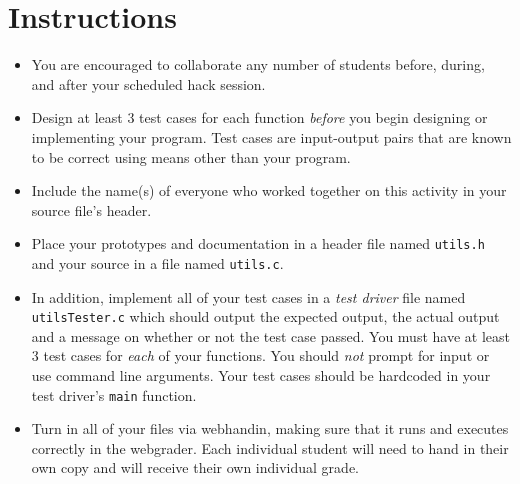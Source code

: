 \documentclass[12pt]{scrartcl}
\begin{document}
\section*{Instructions}

\begin{itemize}
  \item You are encouraged to collaborate any number of students 
  before, during, and after your scheduled hack session.  
  \item Design at least 3 test cases for each function
  \emph{before} you begin
  designing or implementing your program.  Test cases are 
  input-output pairs that are known to be correct using means
  other than your program.
  \item Include the name(s) of everyone who worked together on
  this activity in your source file's header.
  \item Place your prototypes and documentation in a header file 
  named \texttt{utils.h} and your source in a file
  named \texttt{utils.c}.
  \item In addition, implement all of your test cases in a
  \emph{test driver} file named \texttt{utilsTester.c}
  which should output the expected output, the actual output and
  a message on whether or not the test case passed.  You must have
  at least 3 test cases for \emph{each} of your functions.
  You should \emph{not} prompt for input or use command line 
  arguments.  Your test cases should be hardcoded in your test 
  driver's \texttt{main} function.  
  \item Turn in all of your files via webhandin, making sure that 
  it runs and executes correctly in the webgrader.  Each individual 
  student will need to hand in their own copy and will receive 
  their own individual grade.
\end{itemize}
  
\end{document}
